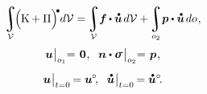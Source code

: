 \nopagebreak
\hspace*{-\parindent}\begin{minipage}{\linewidth}
\begin{equation}\label{dynamicsoflineartheory:integralofenergy}
\displaystyle\integral\displaylimits_{\mathcal{V}}
\hspace{-0.4ex} \Bigl( \hspace{-0.1ex} \kineticenergydensity + \potentialenergydensity \Bigr)^{\hspace{-0.33ex}\tikz[baseline=-0.2ex] \draw[black, fill=black] (0,0) circle (.28ex);} d\mathcal{V}
= \hspace{-0.2ex}
\displaystyle\integral\displaylimits_{\mathcal{V}} \hspace{-0.5ex} \bm{f} \hspace{-0.1ex} \dotp \mathdotabove{\bm{u}} \hspace{.3ex} d\mathcal{V}
+ \hspace{-0.2ex}
\displaystyle\integral\displaylimits_{o_2} \hspace{-0.4ex} \bm{p} \dotp \mathdotabove{\bm{u}} \hspace{.3ex} do
\hspace{.15ex} ,
\end{equation}
%
\nopagebreak\vspace{-0.25em}\begin{gather*}
\bm{u} \hspace{.1ex} \bigr|_{o_1} \hspace{-0.64ex} = \hspace{.2ex} \zerovector
\hspace{.1ex} ,
\hspace{.6em}
%
\unitnormalvector \dotp \linearstress \hspace{.2ex} \bigr|_{o_2} \hspace{-0.64ex} = \hspace{.2ex} \bm{p}
\hspace{.15ex} ,
%
\\[.5em]
%
\bm{u} \hspace{.1ex} \bigr|_{t=0} \hspace{-0.2ex} = \bm{u}^{\hspace{-0.1ex}\circ}
\hspace{-0.4ex} ,
\hspace{.6em}
%
\mathdotabove{\bm{u}} \hspace{.1ex} \bigr|_{t=0} \hspace{-0.2ex} = \mathdotabove{\bm{u}}^{\circ}
\hspace{-0.4ex} .
\end{gather*}
\end{minipage}

